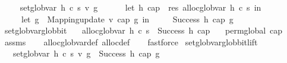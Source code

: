 \begin{isabellebody}
\ \ \isanewline
\ \ {\isachardoublequoteopen}set{\isacharunderscore}{\kern0pt}glob{\isacharunderscore}{\kern0pt}var\ h\ c\ s\ v\ g\ {\isasymequiv}\isanewline
\ \ \ \ \ let\ {\isacharparenleft}{\kern0pt}h{\isacharprime}{\kern0pt}{\isacharcomma}{\kern0pt}\ cap{\isacharparenright}{\kern0pt}\ {\isacharequal}{\kern0pt}\ res\ {\isacharparenleft}{\kern0pt}alloc{\isacharunderscore}{\kern0pt}glob{\isacharunderscore}{\kern0pt}var\ h\ c\ s{\isacharparenright}{\kern0pt}\ in\isanewline
\ \ \ \ \ let\ g{\isacharprime}{\kern0pt}\ {\isacharequal}{\kern0pt}\ Mapping{\isachardot}{\kern0pt}update\ v\ cap\ g\ in\isanewline
\ \ \ \ \ Success\ {\isacharparenleft}{\kern0pt}h{\isacharprime}{\kern0pt}{\isacharcomma}{\kern0pt}\ cap{\isacharcomma}{\kern0pt}\ g{\isacharprime}{\kern0pt}{\isacharparenright}{\kern0pt}{\isachardoublequoteclose}\isanewline
\isanewline
{}\isamarkupfalse%
\ set{\isacharunderscore}{\kern0pt}glob{\isacharunderscore}{\kern0pt}var{\isacharunderscore}{\kern0pt}glob{\isacharunderscore}{\kern0pt}bit{\isacharcolon}{\kern0pt}\isanewline
\ \ \ {\isachardoublequoteopen}alloc{\isacharunderscore}{\kern0pt}glob{\isacharunderscore}{\kern0pt}var\ h\ c\ s\ {\isacharequal}{\kern0pt}\ Success\ {\isacharparenleft}{\kern0pt}h{\isacharprime}{\kern0pt}{\isacharcomma}{\kern0pt}\ cap{\isacharparenright}{\kern0pt}{\isachardoublequoteclose}\isanewline
\ \ \ {\isachardoublequoteopen}perm{\isacharunderscore}{\kern0pt}global\ cap{\isachardoublequoteclose}\isanewline
%
\isadelimproof
\ \ %
\endisadelimproof
%
\isatagproof
{}\isamarkupfalse%
\ assms\isanewline
\ \ \isamarkupfalse%
\ alloc{\isacharunderscore}{\kern0pt}glob{\isacharunderscore}{\kern0pt}var{\isacharunderscore}{\kern0pt}def\ alloc{\isacharunderscore}{\kern0pt}def\isanewline
\ \ \isamarkupfalse%
\ fastforce%
\endisatagproof
{\isafoldproof}%
%
\isadelimproof
\isanewline
%
\endisadelimproof
\isanewline
{}\isamarkupfalse%
\ set{\isacharunderscore}{\kern0pt}glob{\isacharunderscore}{\kern0pt}var{\isacharunderscore}{\kern0pt}glob{\isacharunderscore}{\kern0pt}bit{\isacharunderscore}{\kern0pt}lift{\isacharcolon}{\kern0pt}\isanewline
\ \ \ {\isachardoublequoteopen}set{\isacharunderscore}{\kern0pt}glob{\isacharunderscore}{\kern0pt}var\ h\ c\ s\ v\ g\ {\isacharequal}{\kern0pt}\ Success\ {\isacharparenleft}{\kern0pt}h{\isacharprime}{\kern0pt}{\isacharcomma}{\kern0pt}\ cap{\isacharcomma}{\kern0pt}\ g{\isacharprime}{\kern0pt}{\isacharparenright}{\kern0pt}{\isachardoublequoteclose}\isanewline

\end{isabellebody}
